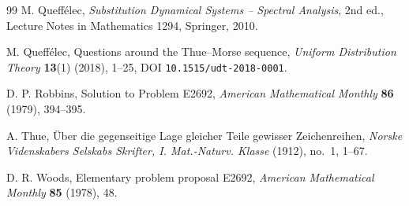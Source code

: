 \documentclass[11pt,oneside]{article}
\theoremstyle{definition}
\theoremstyle{remark}
\begin{document}
\begin{thebibliography}{99}
M. Queff\'elec,
\emph{Substitution Dynamical Systems -- Spectral Analysis},
2nd ed., Lecture Notes in Mathematics 1294, Springer, 2010.

M. Queff\'elec,
Questions around the Thue--Morse sequence,
\emph{Uniform Distribution Theory} \textbf{13}(1) (2018), 1--25,
DOI \nolinkurl{10.1515/udt-2018-0001}.

D. P. Robbins,
Solution to Problem E2692,
\emph{American Mathematical Monthly} \textbf{86} (1979), 394--395.

A. Thue,
\"Uber die gegenseitige Lage gleicher Teile gewisser Zeichenreihen,
\emph{Norske Videnskabers Selskabs Skrifter, I. Mat.-Naturv. Klasse}
(1912), no.~1, 1--67.

D. R. Woods,
Elementary problem proposal E2692,
\emph{American Mathematical Monthly} \textbf{85} (1978), 48.

\end{thebibliography}
\end{document}
